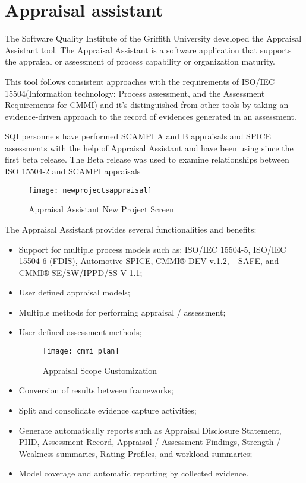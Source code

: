 \section{Appraisal assistant}

The Software Quality Institute of the Griffith University\citep{SoftwareQuality2015} developed the Appraisal Assistant tool. The Appraisal Assistant\citep{Appraisal2015} is a software application that supports the appraisal or assessment of process capability or organization maturity.

This tool follows consistent approaches with the requirements of ISO/IEC 15504(Information technology: Process assessment, and the Assessment Requirements for CMMI)\citep{ISOIEC} and it's distinguished from other tools by taking an evidence-driven approach to the record of evidences generated in an assessment.

SQI personnels have performed SCAMPI A and B appraisals and SPICE assessments with the help of Appraisal Assistant and have been using since the first beta release. The Beta release was used to examine relationships between ISO 15504-2 and SCAMPI appraisals

\begin{figure}[h]
	\begin{center}
		\leavevmode
		\texttt{[image: newprojectsappraisal]}
		\caption{Appraisal Assistant New Project Screen}
		\label{fig:newprojectsappraisal}
	\end{center}
\end{figure}

The Appraisal Assistant provides several functionalities and benefits:
\begin{itemize}
	\item Support for multiple process models such as: ISO/IEC 15504-5, ISO/IEC 15504-6 (FDIS), Automotive SPICE, CMMI®-DEV v.1.2, +SAFE, and CMMI® SE/SW/IPPD/SS V 1.1;
	\item User defined appraisal models;
	\item Multiple methods for performing appraisal / assessment;
	\item User defined assessment methods;
	\begin{figure}[h]
		\begin{center}
			\leavevmode
			\texttt{[image: cmmi\_plan]}
			\caption{Appraisal Scope Customization}
			\label{fig:cmmi_plan}
		\end{center}
	\end{figure}
	\item Conversion of results between frameworks;
	\item Split and consolidate evidence capture activities;
	\item Generate automatically reports such as Appraisal Disclosure Statement, PIID, Assessment Record, Appraisal / Assessment Findings, Strength / Weakness summaries, Rating Profiles, and workload summaries;
	\item Model coverage and automatic reporting by collected evidence.
\end{itemize}


